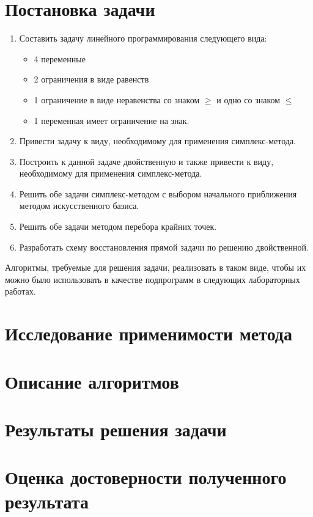 \documentclass[main.tex]{subfiles}
\begin{document}
\section{Постановка задачи}
\begin{enumerate}
\item Составить задачу линейного программирования следующего вида:
	\begin{itemize}
	\item 4 переменные
	\item 2 ограничения в виде равенств
	\item 1 ограничение в виде неравенства со знаком $\geq$ и одно со знаком $\leq$
	\item 1 переменная имеет ограничение на знак.
	\end{itemize}
\item Привести задачу к виду, необходимому для применения симплекс-метода.
\item Построить к данной задаче двойственную и также привести к виду, необходимому для применения симплекс-метода.
\item Решить обе задачи симплекс-методом с выбором начального приближения методом искусственного базиса.
\item Решить обе задачи методом перебора крайних точек.
\item Разработать схему восстановления прямой задачи по решению двойственной.
\end{enumerate}
Алгоритмы, требуемые для решения задачи, реализовать в таком виде, чтобы их можно было использовать в качестве подпрограмм в следующих лабораторных работах.
\section{Исследование применимости метода}
\section{Описание алгоритмов}

\section{Результаты решения задачи}
\section{Оценка достоверности полученного результата}
\end{document}
